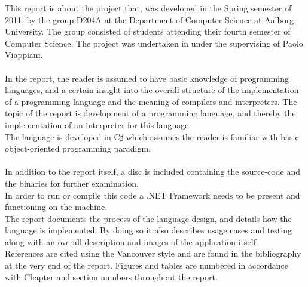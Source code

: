 This report is about the project that, was developed in the Spring semester of 2011, by the group D204A at the Department of Computer Science at Aalborg University. The group consisted of students attending their fourth semester of Computer Science. The project was undertaken in under the supervising of Paolo Viappiani. \\
\\
In the report, the reader is assumed to have basic knowledge of programming languages, and a certain insight into the overall structure of the implementation of a programming language and the meaning of compilers and interpreters. The topic of the report is development of a programming language, and thereby the implementation of an interpreter for this language. \\
The language is developed in C$\sharp$ which assumes the reader is familiar with basic object-oriented programming paradigm\cite{paradigms}. \\
\\
In addition to the report itself, a disc is included containing the source-code and the binaries for further examination. \\
In order to run or compile this code a .NET Framework needs to be present and functioning on the machine. \\

The report documents the process of the language design, and details how the language is implemented. By doing so it also describes usage cases and testing along with an overall description and images of the application itself. \\

References are cited using the Vancouver style and are found in the bibliography at the very end of the report. 
Figures and tables are numbered in accordance with Chapter and section numbers throughout the report.

\newpage\mbox{}\newpage